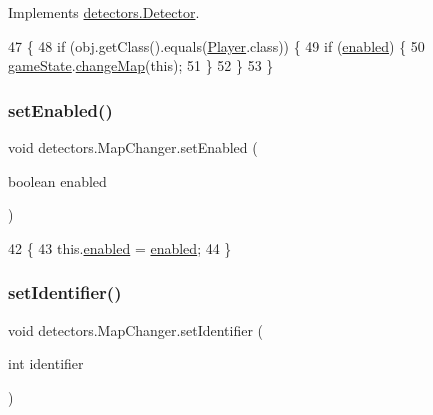 Implements \mbox{\hyperlink{interfacedetectors_1_1_detector_ab35eeb78e8216f8100d4651993668d44}{detectors.\+Detector}}.


\begin{DoxyCode}
47                                        \{
48         \textcolor{keywordflow}{if} (obj.getClass().equals(\mbox{\hyperlink{class_player}{Player}}.class)) \{
49             \textcolor{keywordflow}{if} (\mbox{\hyperlink{classdetectors_1_1_map_changer_a603d3a106676167a607d9acd5176f8f8}{enabled}}) \{
50                 \mbox{\hyperlink{classdetectors_1_1_map_changer_a2a72dbaade77a4f83acdc5ba1d745c48}{gameState}}.\mbox{\hyperlink{classstates_1_1_game_state_a48c6c35635d58caba6995ea8dbd328cd}{changeMap}}(\textcolor{keyword}{this});
51             \}
52         \}
53     \}
\end{DoxyCode}
\mbox{\label{classdetectors_1_1_map_changer_ae99885d28c5978a4dcbc0e1c484eb7a0}} 
\subsubsection{\texorpdfstring{set\+Enabled()}{setEnabled()}}
{\footnotesize\ttfamily void detectors.\+Map\+Changer.\+set\+Enabled (\begin{DoxyParamCaption}\item[{boolean}]{enabled }\end{DoxyParamCaption})\hspace{0.3cm}{\ttfamily [inline]}}


\begin{DoxyCode}
42                                             \{
43         this.\mbox{\hyperlink{classdetectors_1_1_map_changer_a603d3a106676167a607d9acd5176f8f8}{enabled}} = \mbox{\hyperlink{classdetectors_1_1_map_changer_a603d3a106676167a607d9acd5176f8f8}{enabled}};
44     \}
\end{DoxyCode}
\mbox{\label{classdetectors_1_1_map_changer_ae812ca1f161dd4e001b87b3a7961fb17}} 
\subsubsection{\texorpdfstring{set\+Identifier()}{setIdentifier()}}
{\footnotesize\ttfamily void detectors.\+Map\+Changer.\+set\+Identifier (\begin{DoxyParamCaption}\item[{int}]{identifier }\end{DoxyParamCaption})\hspace{0.3cm}{\ttfamily [inline]}}


